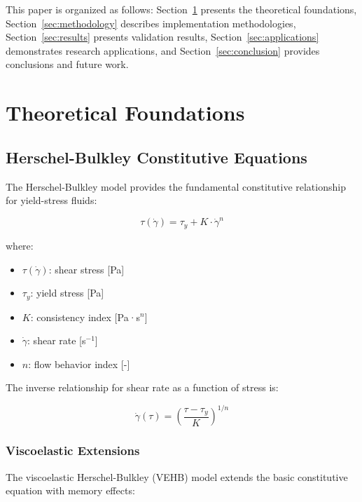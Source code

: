 \documentclass[11pt,a4paper]{article}
\begin{document}
This paper is organized as follows: Section~\ref{sec:theoretical} presents the theoretical foundations, Section~\ref{sec:methodology} describes implementation methodologies, Section~\ref{sec:results} presents validation results, Section~\ref{sec:applications} demonstrates research applications, and Section~\ref{sec:conclusion} provides conclusions and future work.

\section{Theoretical Foundations}
\label{sec:theoretical}

\subsection{Herschel-Bulkley Constitutive Equations}
\label{subsec:hb_model}

The Herschel-Bulkley model provides the fundamental constitutive relationship for yield-stress fluids:

\begin{equation}
\tau(\dot{\gamma}) = \tau_y + K\cdot\dot{\gamma}^n
\label{eq:hb_constitutive}
\end{equation}

where:
\begin{itemize}
    \item $\tau(\dot{\gamma})$: shear stress [Pa]
    \item $\tau_y$: yield stress [Pa]
    \item $K$: consistency index [Pa·s$^n$]
    \item $\dot{\gamma}$: shear rate [s$^{-1}$]
    \item $n$: flow behavior index [-]
\end{itemize}

The inverse relationship for shear rate as a function of stress is:

\begin{equation}
\dot{\gamma}(\tau) = \left( \frac{\tau - \tau_y}{K} \right)^{1/n}
\label{eq:hb_inverse}
\end{equation}

\subsubsection{Viscoelastic Extensions}
\label{subsubsec:viscoelastic}

The viscoelastic Herschel-Bulkley (VEHB) model extends the basic constitutive equation with memory effects:
\end{document}
